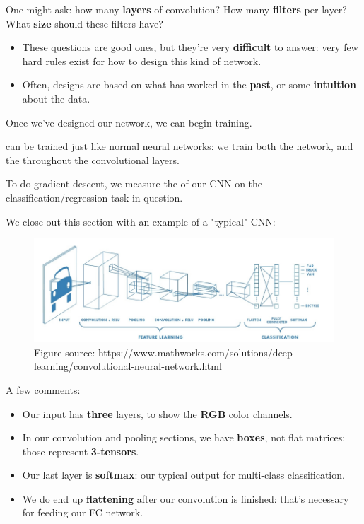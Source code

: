     One might ask: how many \textbf{layers} of convolution? How many \textbf{filters} per layer? What \textbf{size} should these filters have?

    \begin{itemize}
        \item These questions are good ones, but they're very \textbf{difficult} to answer: very few hard rules exist for how to design this kind of network.

        \item Often, designs are based on what has worked in the \textbf{past}, or some \textbf{intuition} about the data.
    \end{itemize}

    Once we've designed our network, we can begin training.\\

    \begin{concept}
         can be trained just like normal neural networks: we train both the  network, and the  throughout the convolutional layers.

        To do gradient descent, we measure the  of our CNN on the classification/regression task in question.
    \end{concept}

    We close out this section with an example of a "typical" CNN:

    \begin{figure}[H]
        \includegraphics[width=\textwidth]{images/convolutional_neural_networks_images/Architecture.png}
        
        \caption*{Figure source: https://www.mathworks.com/solutions/deep-learning/convolutional-neural-network.html}
    \end{figure}

    A few comments:

    \begin{itemize}
        \item Our input has \textbf{three} layers, to show the \textbf{RGB} color channels.
        \item In our convolution and pooling sections, we have \textbf{boxes}, not flat matrices: those represent \textbf{3-tensors}.
        \item Our last layer is \textbf{softmax}: our typical output for multi-class classification.
        \item We do end up \textbf{flattening} after our convolution is finished: that's necessary for feeding our FC network.
    \end{itemize}

